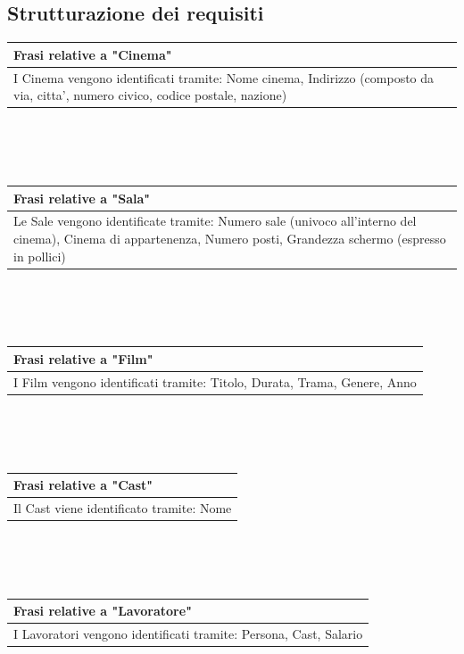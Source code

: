 \documentclass[10pt]{article}
\begin{document}
 	\subsection{Strutturazione dei requisiti}
	\begin{tabular} { |p{16.8cm}| }
 		\hline
 		\rowcolor{lightgray}
 		\textbf{Frasi relative a "Cinema"} \\
 		\hline
 		I Cinema vengono identificati tramite: Nome cinema, Indirizzo (composto da via, citta', numero civico, codice postale, nazione) \\
 		\hline 		
 	\end{tabular}
 	\\\\\\
	\begin{tabular} { |p{16.8cm}| }
	 	\hline
	 	\rowcolor{lightgray}
	 	\textbf{Frasi relative a "Sala"} \\
	 	\hline
	 	Le Sale vengono identificate tramite: Numero sale (univoco all'interno del cinema), Cinema di appartenenza, Numero posti, Grandezza schermo (espresso in pollici) \\
	 	\hline 		
	\end{tabular} 
	\\\\\\
	\begin{tabular} { |p{16.8cm}| }
		\hline
		\rowcolor{lightgray}
		\textbf{Frasi relative a "Film"} \\
		\hline
		I Film vengono identificati tramite: Titolo, Durata, Trama, Genere, Anno \\
		\hline 		
	\end{tabular} 
 	\\\\\\
 	\begin{tabular} { |p{16.8cm}| }
 		\hline
 		\rowcolor{lightgray}
 		\textbf{Frasi relative a "Cast"} \\
 		\hline
 		Il Cast viene identificato tramite: Nome \\
 		\hline 		
 	\end{tabular} 
 	\\\\\\
 	\begin{tabular} { |p{16.8cm}| }
 		\hline
 		\rowcolor{lightgray}
 		\textbf{Frasi relative a "Lavoratore"} \\
 		\hline
 		I Lavoratori vengono identificati tramite: Persona, Cast, Salario \\
 		\hline 		
 	\end{tabular} 
\end{document}
